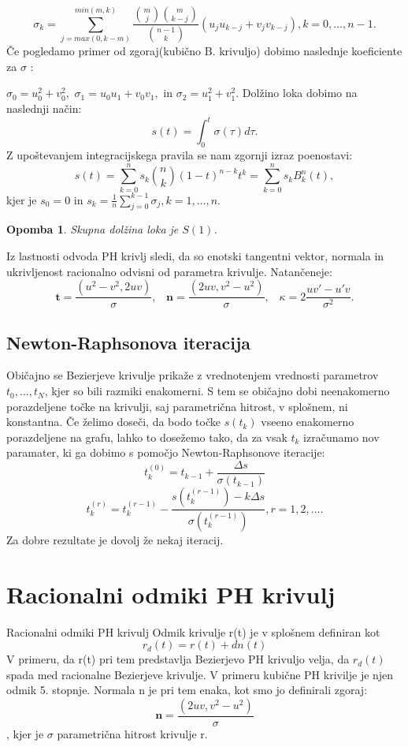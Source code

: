 \documentclass[12pt]{article}
\newtheorem{Opomba}[Izrek]{{\sc Opomba}}
\begin{document}
$$\sigma_k =\sum_{j=max(0,k-m)}^{min(m,k)}\frac{\binom{m}{j}\binom{m}{k-j}}{\binom{n-1}{k}}(u_ju_{k-j}+v_jv_{k-j}), k = 0,\ldots , n - 1.$$
\newline
Če pogledamo primer od zgoraj(kubično B. krivuljo) dobimo naslednje koeficiente za $\sigma $ :

$\sigma_0 = u^2_0+ v^2_0, $
$\sigma_1 = u_0u_1 + v_0v_1,$ in  
$\sigma_2 = u^2_1+ v^2_1.$
\newline
Dolžino loka dobimo na naslednji način:
$$s (t) =\int^t_0\sigma(\tau) d\tau.$$
Z upoštevanjem integracijskega pravila se nam zgornji izraz poenostavi: 
$$s (t) =\sum^n_{k=0}s_k\binom{n}{k}(1-t)^{n-k}t^k=\sum_{k=0}^n s_kB^n_k(t),$$
kjer je $s_0=0$ in $s_k=\frac{1}{n}\sum^{k-1}_{j=0}\sigma_j, k=1,\ldots,n.$
\begin{Opomba}
	Skupna dolžina loka je $S(1)$. 
\end{Opomba}

Iz lastnosti odvoda PH krivlj sledi, da so enotski tangentni vektor,
normala in ukrivljenost racionalno odvisni od parametra krivulje. Natančeneje: 
$$\textbf{t} =\frac{(u^2 - v^2, 2uv)}{\sigma},\hspace{10pt} \textbf{n} =\frac{(2uv, v^2 - u^2)}{\sigma},\hspace{10pt} \kappa = 2 \frac{uv\prime - u\prime v}{\sigma^2}.$$

\subsection*{Newton-Raphsonova iteracija}
Običajno se Bezierjeve krivulje prikaže z vrednotenjem vrednosti parametrov  $t_0,\ldots , t_N$, kjer so bili razmiki enakomerni.
S tem se običajno dobi neenakomerno porazdeljene točke na krivulji, saj parametrična 
hitrost, v splošnem, ni konstantna.
Če želimo doseči, da bodo točke $s(t_k)$ vseeno enakomerno porazdeljene na grafu,
lahko to dosežemo tako, da za vsak $t_k$ izračunamo nov paramater, ki ga dobimo 
s pomočjo Newton-Raphsonove iteracije: 
$$t^{(0)}_k = t_{k-1}+\frac{\Delta s}{\sigma(t_{k-1})}$$
$$t^{(r)}_k = t^{(r-1)}_k-\frac{s(t^{(r-1)}_k)-k\Delta s}{\sigma(t^{(r-1)}_k)}, r = 1, 2,\ldots.$$
Za dobre rezultate je dovolj že nekaj iteracij.



\section{Racionalni odmiki PH krivulj}
Racionalni odmiki PH krivulj
Odmik krivulje r(t) je v splošnem definiran kot
$$ r_d(t) = r(t) + dn(t)$$
V primeru, da r(t) pri tem predstavlja Bezierjevo PH krivuljo velja, 
da $r_d(t)$ spada med racionalne Bezierjeve krivulje. V primeru kubične PH krivilje 
je njen odmik 5. stopnje. Normala n je pri tem enaka, kot smo jo definirali zgoraj:
$$\textbf{n} =\frac{(2uv, v^2 - u^2)}{\sigma}$$,
kjer je $\sigma$ parametrična hitrost krivulje r.
\end{document}
